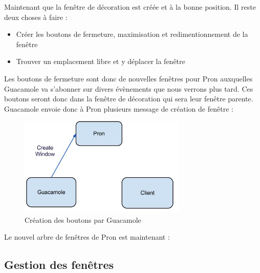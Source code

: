 \begin{center}
\end{center}

Maintenant que la fenêtre de décoration est créée et à la bonne position.
Il reste deux choses à faire :

\begin{itemize}
  \item Créer les boutons de fermeture, maximisation et redimentionnement de la fenêtre
  \item Trouver un emplacement libre et y déplacer la fenêtre
\end{itemize}

Les boutons de fermeture sont donc de nouvelles fenêtres pour Pron auxquelles Guacamole va s'abonner sur divers évènements que nous verrons plus tard.
Ces boutons seront donc dans la fenêtre de décoration qui sera leur fenêtre parente.
Guacamole envoie donc à Pron plusieurs message de création de fenêtre :

\begin{figure}[H]
  \centering
  \includegraphics[width=8cm]{images/Guacamole_anim_6.jpg}
  \caption{Création des boutons par Guacamole}
  \label{fig:guacamole_anim_6}
\end{figure}

Le nouvel arbre de fenêtres de Pron est maintenant :

\begin{center}
\end{center}


\subsection{Gestion des fenêtres}

